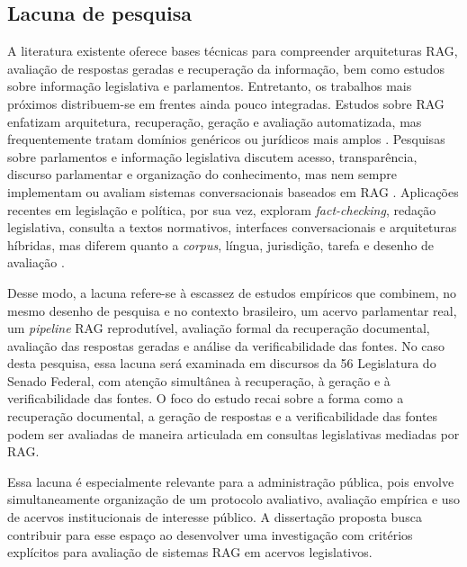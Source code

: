 \subsection{Lacuna de pesquisa}

A literatura existente oferece bases técnicas para compreender arquiteturas RAG, avaliação de respostas geradas e recuperação da informação, bem como estudos sobre informação legislativa e parlamentos. Entretanto, os trabalhos mais próximos distribuem-se em frentes ainda pouco integradas. Estudos sobre RAG enfatizam arquitetura, recuperação, geração e avaliação automatizada, mas frequentemente tratam domínios genéricos ou jurídicos mais amplos \parencite{gao2023ragSurvey,saadFalconEtAl2024ares,esEtAl2023ragas,pipitoneAlami2024legalbenchRag}. Pesquisas sobre parlamentos e informação legislativa discutem acesso, transparência, discurso parlamentar e organização do conhecimento, mas nem sempre implementam ou avaliam sistemas conversacionais baseados em RAG \parencite{skubicFiser2024discourseReview,blanco2025plenarioPalanqueEstudio,blanco2026letrasGraudas,martelloteViola2025organizacaoConhecimento}. Aplicações recentes em legislação e política, por sua vez, exploram \textit{fact-checking}, redação legislativa, consulta a textos normativos, interfaces conversacionais e arquiteturas híbridas, mas diferem quanto a \textit{corpus}, língua, jurisdição, tarefa e desenho de avaliação \parencite{khaliq2024ragar,chouhanGertz2024lexdrafter,garrisonEtAl2024talkNdaa,rogiersEtAl2024kamerraad,colomboEtAl2025legisSearch,mosbachEtAl2025worldAvatarParliament}.

Desse modo, a lacuna refere-se à escassez de estudos empíricos que combinem, no mesmo desenho de pesquisa e no contexto brasileiro, um acervo parlamentar real, um \textit{pipeline} RAG reprodutível, avaliação formal da recuperação documental, avaliação das respostas geradas e análise da verificabilidade das fontes. No caso desta pesquisa, essa lacuna será examinada em discursos da 56\textordfeminine{} Legislatura do Senado Federal, com atenção simultânea à recuperação, à geração e à verificabilidade das fontes. O foco do estudo recai sobre a forma como a recuperação documental, a geração de respostas e a verificabilidade das fontes podem ser avaliadas de maneira articulada em consultas legislativas mediadas por RAG.

Essa lacuna é especialmente relevante para a administração pública, pois envolve simultaneamente organização de um protocolo avaliativo, avaliação empírica e uso de acervos institucionais de interesse público. A dissertação proposta busca contribuir para esse espaço ao desenvolver uma investigação com critérios explícitos para avaliação de sistemas RAG em acervos legislativos.
